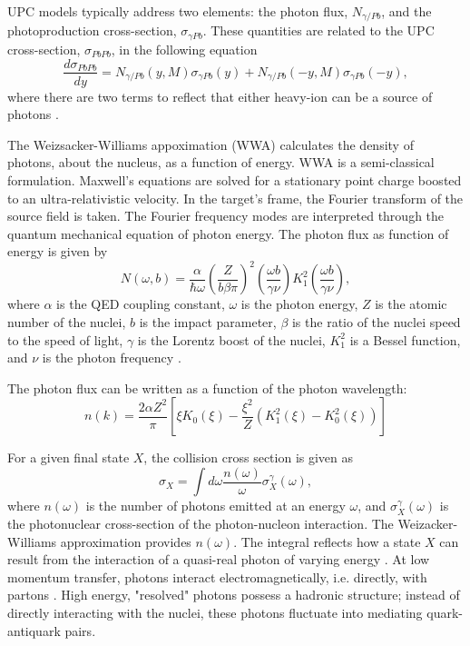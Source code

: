 UPC models typically address two elements: the photon flux, $N_{\gamma / Pb}$, and the photoproduction cross-section, $\sigma_{\gamma Pb}$. These quantities are related to the UPC cross-section, $\sigma_{PbPb}$, in the following equation
\begin{equation}
\frac{d \sigma_{PbPb}}{dy} = N_{\gamma/Pb}(y,M)\sigma_{\gamma Pb}(y)+N_{\gamma/Pb}(-y,M)\sigma_{\gamma Pb}(-y),
\end{equation}
where there are two terms to reflect that either heavy-ion can be a source of photons \cite{Bertulani:2005ru}. 

The Weizsacker-Williams appoximation (WWA) calculates the density of photons, about the nucleus, as a function of energy. WWA is a semi-classical formulation. Maxwell's equations are solved for a stationary point charge boosted to an ultra-relativistic velocity. In the target's frame, the Fourier transform of the source field is taken. The Fourier frequency modes are interpreted through the quantum mechanical equation of photon energy. The photon flux as function of energy is given by
\begin{equation}
N(\omega,b) = \frac{\alpha}{\hbar \omega}\left( \frac{Z}{b\beta\pi} \right)^2\left ( \frac{\omega b}{\gamma \nu} \right )K_1^2\left ( \frac{\omega b}{\gamma \nu} \right ) ,
\end{equation}
where $\alpha$ is the QED coupling constant, $\omega$ is the photon energy, $Z$ is the atomic number of the nuclei, $b$ is the impact parameter, $\beta$ is the ratio of the nuclei speed to the speed of light, $\gamma$ is the Lorentz boost of the nuclei, $K_1^2$ is a Bessel function, and $\nu$ is the photon frequency \cite{WWJackson}.

The photon flux can be written as a function of the photon wavelength:
\begin{equation}
n(k) = \frac{2 \alpha Z^2}{\pi}\left [ \xi K_0(\xi) - \frac{\xi^2}{Z}(K_1^2(\xi)-K_0^2(\xi)) \right ]
\end{equation}

For a given final state $X$, the collision cross section is given as
\begin{equation}
\sigma_X = \int d \omega \frac{n(\omega)}{\omega} \sigma_X^\gamma(\omega),
\end{equation}
where $n(\omega)$ is the number of photons emitted at an energy $\omega$, and $\sigma_X^\gamma(\omega)$ is the photonuclear cross-section of the photon-nucleon interaction. The Weizacker-Williams approximation provides $n(\omega)$. The integral reflects how a state $X$ can result from the interaction of a quasi-real photon of varying energy \cite{Nystrand:2004vn}. At low momentum transfer, photons interact electromagnetically, i.e. directly, with partons \cite{photonALICE}. High energy, "resolved" photons possess a hadronic structure; instead of directly interacting with the nuclei, these photons fluctuate into mediating quark-antiquark pairs.

